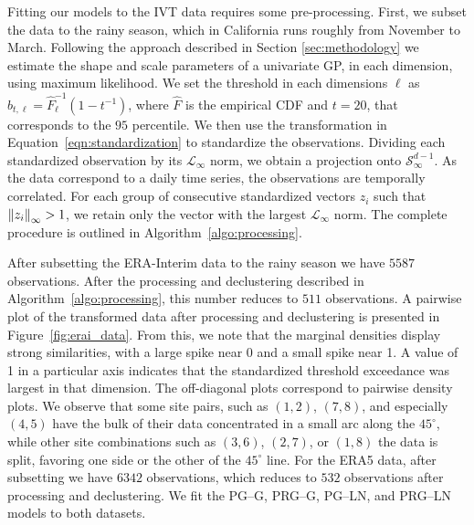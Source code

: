Fitting our models to the IVT data requires some pre-processing. First, we subset the data to the rainy
  season, which in California runs roughly from November to March.  Following the approach described 
  in Section \ref{sec:methodology} we estimate the shape and scale parameters of a univariate GP, in each
  dimension, using maximum likelihood. We set the threshold in each dimensions $\ell$ as  
  $b_{t,\ell} = \hat{F}_{\ell}^{-1}(1 - t^{-1})$, where $\hat{F}$ is the empirical CDF and $t=20$, 
  that corresponds to the $95$ percentile. We then use the transformation in Equation~\eqref{eqn:standardization} 
  to standardize the observations.  Dividing each standardized observation
  by its $\mathcal{L}_{\infty}$ norm, we obtain a projection onto $\mathcal{S}_{\infty}^{d-1}$. As 
  the data correspond to a daily time series, the observations are temporally correlated.  For each
  group of consecutive standardized vectors $z_i$ such  that  $\inorm{z_i} > 1$, we retain only the
  vector with the largest $\mathcal{L}_{\infty}$ norm.  The complete procedure is outlined in
  Algorithm~\ref{algo:processing}.  
  
After subsetting the ERA-Interim data to the rainy season we 
  have $5587$ observations. After the processing and declustering described in
  Algorithm~\ref{algo:processing}, this number reduces to $511$ observations. A pairwise plot 
  of the transformed data after processing and declustering is presented in 
  Figure~\ref{fig:erai_data}.  From this, we note that the marginal densities display strong
  similarities, with a large spike near 0 and a small spike near 1. A value of 1 in a particular 
  axis indicates that the standardized threshold exceedance was largest in that dimension.  
  The off-diagonal plots correspond to pairwise density plots.  We observe that some site pairs, such 
  as $(1,2)$, $(7,8)$, and especially $(4,5)$ have the bulk of their data concentrated in a 
  small arc along the $45^{\circ}$, while other site combinations such as $(3,6)$, $(2,7)$, or
  $(1,8)$ the data is split, favoring one side or the other of the $45^{\circ}$ line. For the 
  ERA5 data, after subsetting we have $6342$ observations, which reduces to $532$ observations 
  after processing and declustering. We fit the PG--G, PRG--G, PG--LN, and PRG--LN models to 
  both datasets.

%   

